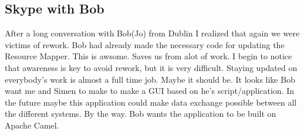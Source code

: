 \subsection{Skype with Bob}
After a long conversation with Bob(Jo) from Dublin I realized that again we were victims of rework. Bob had already made the necessary code for updating the Resource Mapper. This is awsome. Saves us from alot of work. I begin to notice that awareness is key to avoid rework, but it is very difficult. Staying updated on everybody's work is almost a full time job. Maybe it should be. It looks like Bob want me and Simen to make to make a GUI based on he's script/application. In the future maybe this application could make data exchange possible between all the different systems. By the way. Bob wants the application to be built on Apache Camel.
